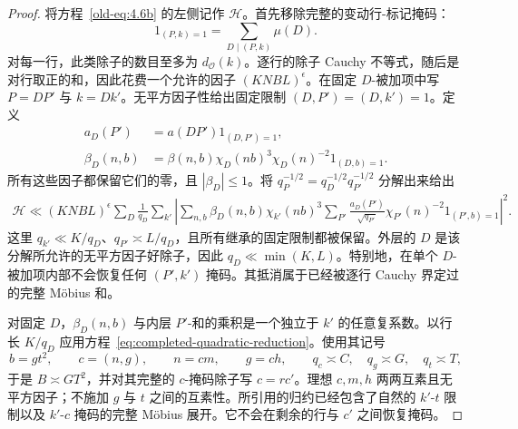 \documentclass[11pt,a4paper]{article}
\numberwithin{equation}{section}
\numberwithin{figure}{section}
\theoremstyle{definition}
\theoremstyle{remark}
\begin{document}
\begin{proof}
将方程~\eqref{old-eq:4.6b} 的左侧记作 \(\mathcal H\)。首先移除完整的变动行-标记掩码：
\[
 1_{(P,k)=1}=\sum_{D\mid(P,k)}\mu(D).
\]
对每一行，此类除子的数目至多为 \(d_{\mathcal O}(k)\)。逐行的除子 Cauchy 不等式，随后是对行取正的和，因此花费一个允许的因子 \((KNBL)^\epsilon\)。在固定 \(D\)-被加项中写 \(P=DP'\) 与 \(k=Dk'\)。无平方因子性给出固定限制 \((D,P')=(D,k')=1\)。定义
\[
 \begin{split}
 a_D(P')&=a(DP')1_{(D,P')=1},\\
 \beta_D(n,b)&=\beta(n,b)\chi_D(nb)^3\chi_D(n)^{-2}1_{(D,b)=1}.
 \end{split}
\]
所有这些因子都保留它们的零，且 \(|\beta_D|\le1\)。将 \(q_P^{-1/2}=q_D^{-1/2}q_{P'}^{-1/2}\) 分解出来给出
\begin{equation}\label{eq:hybrid-mark-mask-reduction}
 \begin{split}
 \mathcal H\ll (KNBL)^\epsilon\sum_D\frac1{q_D}
 \sum_{k'}\left|
 \sum_{n,b}\beta_D(n,b)\chi_{k'}(nb)^3
 \sum_{P'}\frac{a_D(P')}{\sqrt{q_{P'}}}
       \chi_{P'}(n)^{-2}1_{(P',b)=1}
 \right|^2.
 \end{split}
\end{equation}
这里 \(q_{k'}\ll K/q_D\)、\(q_{P'}\asymp L/q_D\)，且所有继承的固定限制都被保留。外层的 \(D\) 是该分解所允许的无平方因子好除子，因此 \(q_D\ll\min(K,L)\)。特别地，在单个 \(D\)-被加项内部不会恢复任何 \((P',k')\) 掩码。其抵消属于已经被逐行 Cauchy 界定过的完整 M\"obius 和。

对固定 \(D\)，\(\beta_D(n,b)\) 与内层 \(P'\)-和的乘积是一个独立于 \(k'\) 的任意复系数。以行长 \(K/q_D\) 应用方程~\eqref{eq:completed-quadratic-reduction}。使用其记号
\[
 b=gt^2,\qquad c=(n,g),\qquad n=cm,\qquad g=ch,
 \qquad q_c\asymp C,\quad q_g\asymp G,\quad q_t\asymp T,
\]
于是 \(B\asymp GT^2\)，并对其完整的 \(c\)-掩码除子写 \(c=rc'\)。理想 \(c,m,h\) 两两互素且无平方因子；不施加 \(g\) 与 \(t\) 之间的互素性。所引用的归约已经包含了自然的 \(k'\)-\(t\) 限制以及 \(k'\)-\(c\) 掩码的完整 M\"obius 展开。它不会在剩余的行与 \(c'\) 之间恢复掩码。


\end{proof}
\end{document}
